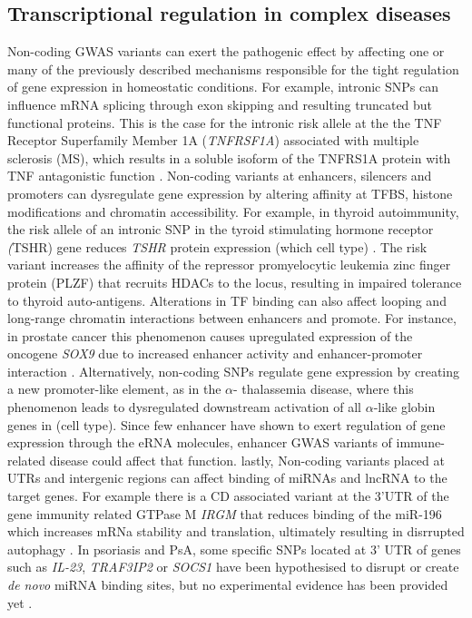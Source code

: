 \subsection{Transcriptional regulation in complex diseases}
Non-coding GWAS variants can exert the pathogenic effect by affecting one or many of the previously described mechanisms responsible for the tight regulation of gene expression in homeostatic conditions. For example, intronic SNPs can influence mRNA splicing through exon skipping and resulting truncated but functional proteins. This is the case for the intronic risk allele at the the TNF Receptor Superfamily Member 1A (\textit{TNFRSF1A}) associated with multiple sclerosis (MS), which results in a soluble isoform of the TNFRS1A protein with TNF antagonistic function \parencite{Gregory2012}. Non-coding variants at enhancers, silencers and promoters can dysregulate gene expression by altering affinity at TFBS, histone modifications and chromatin accessibility. For example, in thyroid autoimmunity, the risk allele of an intronic SNP in the tyroid stimulating hormone receptor \textit(TSHR) gene reduces \textit{TSHR} protein expression (which cell type) \parencite{Stefan2014}. The risk variant increases the affinity of the repressor promyelocytic leukemia zinc finger protein (PLZF) that recruits HDACs to the locus, resulting in impaired tolerance to thyroid auto-antigens. Alterations in TF binding can also affect looping and long-range chromatin interactions between enhancers and promote. For instance, in prostate cancer this phenomenon causes upregulated expression of the oncogene \textit{SOX9} due to increased enhancer activity and enhancer-promoter interaction \parencite{Zhang2012}. 
Alternatively, non-coding SNPs regulate gene expression by creating a new promoter-like element, as in the $\alpha$- thalassemia disease, where this phenomenon leads to dysregulated downstream activation of all $\alpha$-like globin genes in (cell type)\parencite{Gobbi2006}. Since few enhancer have shown to exert regulation of gene expression through the eRNA molecules, enhancer GWAS variants of immune-related disease could affect that function\parencite{Shechner2015,Fahr2014}. lastly, Non-coding variants placed at UTRs and intergenic regions can affect binding of miRNAs and lncRNA to the target genes. For example  there is a CD associated variant at the 3'UTR of the gene immunity related GTPase M \textit{IRGM} that reduces binding of the miR-196 which increases mRNa stability and translation, ultimately resulting in disrrupted autophagy  \parencite{Brest2011}. In psoriasis and PsA, some specific SNPs located at 3' UTR of genes such as \textit{IL-23}, \textit{TRAF3IP2} or \textit{SOCS1} have been hypothesised to disrupt or create \textit{de novo} miRNA binding sites, but no experimental evidence has been provided yet \parencite{Pivarcsi2014}. 





